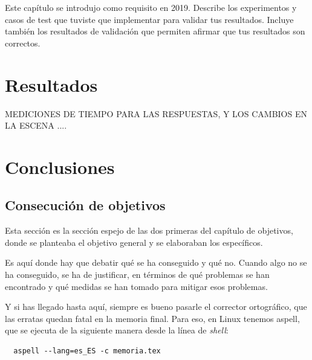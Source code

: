 \documentclass[a4paper, 12pt]{book}
\let\cleardoublepage\clearpage
\begin{document}
Este capítulo se introdujo como requisito en 2019. 
Describe los experimentos y casos de test que tuviste que implementar para validar tus resultados. 
Incluye también los resultados de validación que permiten afirmar que tus resultados son correctos. 



\cleardoublepage
\chapter{Resultados}
\label{chap:resultados}

MEDICIONES DE TIEMPO PARA LAS RESPUESTAS, Y LOS CAMBIOS EN LA ESCENA ....



\cleardoublepage
\chapter{Conclusiones}
\label{chap:conclusiones}


\section{Consecución de objetivos}
\label{sec:consecucion-objetivos}

Esta sección es la sección espejo de las dos primeras del capítulo de objetivos, donde se planteaba el objetivo general y se elaboraban los específicos.

Es aquí donde hay que debatir qué se ha conseguido y qué no. 
Cuando algo no se ha conseguido, se ha de justificar, en términos de qué problemas se han encontrado y qué medidas se han tomado para mitigar esos problemas.

Y si has llegado hasta aquí, siempre es bueno pasarle el corrector ortográfico, que las erratas quedan fatal en la memoria final.
Para eso, en Linux tenemos aspell, que se ejecuta de la siguiente manera desde la línea de \emph{shell}:

\begin{verbatim}
  aspell --lang=es_ES -c memoria.tex
\end{verbatim}
\end{document}
